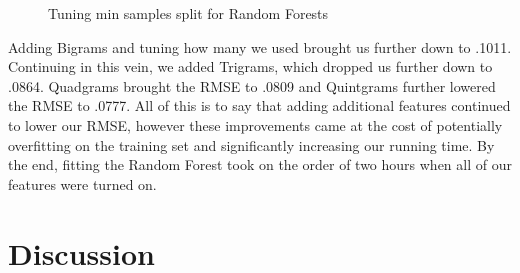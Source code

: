 \documentclass[]{article}
\begin{document}
\begin{flushleft}
\begin{figure}[h]
		\caption{Tuning min samples split for Random Forests}
	\end{figure}
	\newline\newline
	Adding Bigrams and tuning how many we used brought us further down to .1011.  Continuing in this vein, we added Trigrams, which dropped us further down to .0864.  Quadgrams brought the RMSE to .0809 and Quintgrams further lowered the RMSE to .0777.
	\newline\newline
	All of this is to say that adding additional features continued to lower our RMSE, however these improvements came at the cost of potentially overfitting on the training set and significantly increasing our running time.  By the end, fitting the Random Forest took on the order of two hours when all of our features were turned on.
\end{flushleft}
\section{Discussion}
\end{document}
